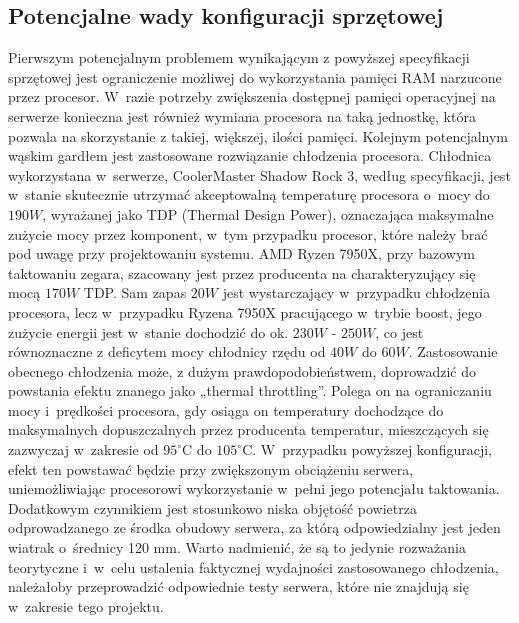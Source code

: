 \subsection{Potencjalne wady konfiguracji sprzętowej}
Pierwszym potencjalnym problemem wynikającym z powyższej specyfikacji sprzętowej jest ograniczenie możliwej do wykorzystania pamięci RAM narzucone przez procesor. W~razie potrzeby zwiększenia dostępnej pamięci operacyjnej na serwerze konieczna jest również wymiana procesora na taką jednostkę, która pozwala na skorzystanie z takiej, większej, ilości pamięci. Kolejnym potencjalnym wąskim gardłem jest zastosowane rozwiązanie chłodzenia procesora. Chłodnica wykorzystana w~serwerze, CoolerMaster Shadow Rock 3, według specyfikacji, jest w~stanie skutecznie utrzymać akceptowalną temperaturę procesora o~mocy do $190 W$, wyrażanej jako TDP (Thermal Design Power), oznaczająca maksymalne zużycie mocy przez komponent, w~tym przypadku procesor, które należy brać pod uwagę przy projektowaniu systemu\cite{intelTdp}. AMD Ryzen 7950X, przy bazowym taktowaniu zegara, szacowany jest przez producenta na charakteryzujący się mocą $170 W$ TDP. Sam zapas $20W$ jest wystarczający w~przypadku chłodzenia procesora, lecz w~przypadku Ryzena 7950X pracującego w~trybie boost, jego zużycie energii jest w~stanie dochodzić do ok. $230 W$ - $250 W$\cite{amdPpt, testyMocy}, co jest równoznaczne z deficytem mocy chłodnicy rzędu od $40W$ do $60W$. Zastosowanie obecnego chłodzenia może, z dużym prawdopodobieństwem, doprowadzić do powstania efektu znanego jako „thermal throttling”\cite{throttling}. Polega on na ograniczaniu mocy i~prędkości procesora, gdy osiąga on temperatury dochodzące do maksymalnych dopuszczalnych przez producenta temperatur, mieszczących się zazwyczaj w~zakresie od $95^{\circ}\mathrm{C}$ do $105^{\circ}\mathrm{C}$. W~przypadku powyższej konfiguracji, efekt ten powstawać będzie przy zwiększonym obciążeniu serwera, uniemożliwiając procesorowi wykorzystanie w~pełni jego potencjału taktowania. Dodatkowym czynnikiem jest stosunkowo niska objętość powietrza odprowadzanego ze środka obudowy serwera, za którą odpowiedzialny jest jeden wiatrak o~średnicy 120 mm. Warto nadmienić, że są to jedynie rozważania teorytyczne i~w~celu ustalenia faktycznej wydajności zastosowanego chłodzenia, należałoby przeprowadzić odpowiednie testy serwera, które nie znajdują się w~zakresie tego projektu.

